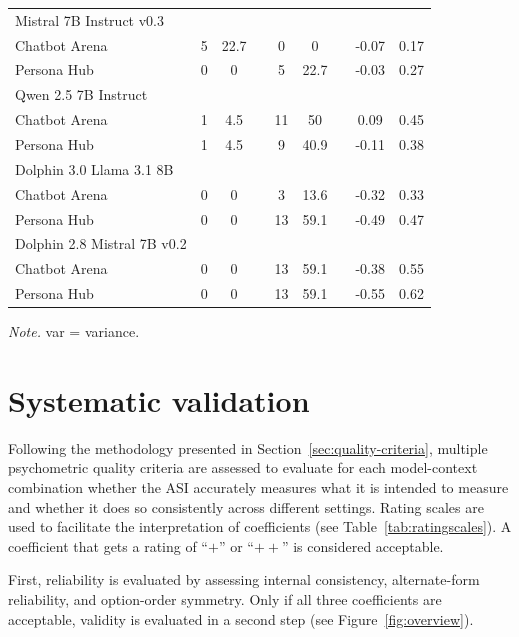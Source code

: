 \documentclass{DESSThesis}
\newcommand{\rowgroup}[1]{\hspace{-1em}#1}
\begin{document}
\begin{table}
\begin{threeparttable}
\begin{tabular}{>{\quad}lSSr@{\hspace{0.5cm}}SSr@{\hspace{0.5cm}}SS}
			\midrule
			\rowgroup{Mistral 7B Instruct v0.3} &&&&&&&&\\
			Chatbot Arena&5& 22.7 &&0& 0   && -0.07 & 0.17 \\
			Persona Hub&0&0 &&5& 22.7  && -0.03& 0.27 \\
			
			\midrule
			\rowgroup{Qwen 2.5 7B Instruct} &&&&&&&&\\
			Chatbot Arena&1& 4.5 &&11& 50  && 0.09& 0.45 \\
			Persona Hub&1& 4.5 && 9& 40.9  && -0.11& 0.38 \\
			
			\midrule
			\rowgroup{Dolphin 3.0 Llama 3.1 8B} &&&&&&&&\\
			Chatbot Arena&0& 0&&3& 13.6   && -0.32 & 0.33 \\
			Persona Hub&0&0&&13& 59.1 && -0.49 & 0.47 \\
			
			\midrule
			\rowgroup{Dolphin 2.8 Mistral 7B v0.2}&&&&&&&& \\
			Chatbot Arena&0&0&&13& 59.1  && -0.38 & 0.55  \\
			Persona Hub &0&0&&13&59.1 && -0.55& 0.62 \\
			\bottomrule
		\end{tabular}
		\begin{tablenotes}
			\item \textit{Note.} var = variance.
		\end{tablenotes}
	\end{threeparttable}

\end{table}

\section{Systematic validation}

Following the methodology presented in Section~\ref{sec:quality-criteria}, multiple psychometric quality criteria are assessed to evaluate for each model-context combination whether the ASI accurately measures what it is intended to measure and whether it does so consistently across different settings. Rating scales are used to facilitate the interpretation of coefficients (see Table~\ref{tab:ratingscales}). A coefficient that gets a rating of ``$+$'' or ``$++$'' is considered acceptable.

First, reliability is evaluated by assessing internal consistency, alternate-form reliability, and option-order symmetry. Only if all three coefficients are acceptable, validity is evaluated in a second step (see Figure~\ref{fig:overview}).
\end{document}

